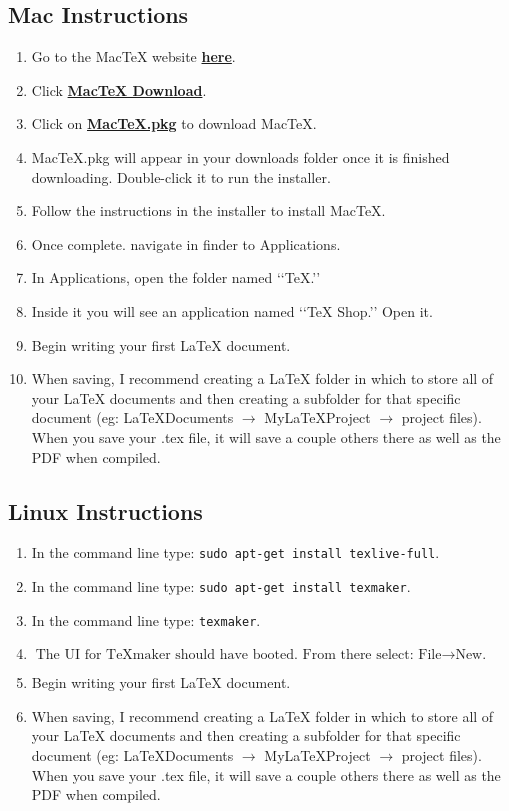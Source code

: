	\subsection{Mac Instructions}
		\begin{enumerate}
			\item Go to the MacTeX website \href{http://www.tug.org/mactex/}{\textbf{here}}.
			\item Click \href{http://www.tug.org/mactex/mactex-download.html}{\textbf{MacTeX Download}}.
			\item Click on \href{http://tug.org/cgi-bin/mactex-download/MacTeX.pkg}{\textbf{MacTeX.pkg}} to download MacTeX.
			\item MacTeX.pkg will appear in your downloads folder once it is finished downloading. Double-click it to run the installer.
			\item Follow the instructions in the installer to install MacTeX.
			\item Once complete. navigate  in finder to Applications.
			\item In Applications, open the folder named \lq\lq{}TeX.\rq\rq{}
			\item Inside it you will see an application named \lq\lq{}TeX Shop.\rq\rq{} Open it.
			\item Begin writing your first \LaTeX{} document.
			\item When saving, I recommend creating a LaTeX folder in which to store all of your  \LaTeX{} documents and then creating a subfolder for that specific document (eg: LaTeXDocuments \(\rightarrow\) MyLaTeXProject \(\rightarrow\) project files). When you save your .tex file, it will save a couple others there as well as the PDF when compiled.
		\end{enumerate}

	\subsection{Linux Instructions}
		\begin{enumerate}
			\item In the command line type: \texttt{sudo apt-get install texlive-full}.
			\item In the command line type: \texttt{sudo apt-get install texmaker}.
			\item In the command line type: \texttt{texmaker}.
			\item \(\text{The UI for TeXmaker should have booted. From there select: File} \rightarrow \text{New.}\)
			\item Begin writing your first \LaTeX{} document.
			\item When saving, I recommend creating a LaTeX folder in which to store all of your \LaTeX{} documents and then creating a subfolder for that specific document (eg: LaTeXDocuments \(\rightarrow\) MyLaTeXProject \(\rightarrow\) project files). When you save your .tex file, it will save a couple others there as well as the PDF when compiled.
		\end{enumerate}

